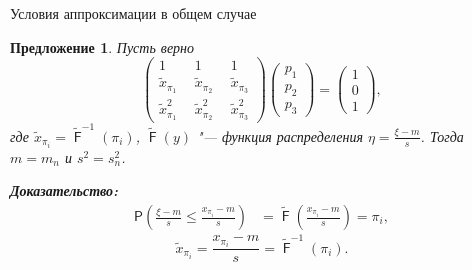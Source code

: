 \documentclass[ucs, notheorems, handout]{beamer}
\newtheorem{proposition}[theorem]{Предложение}
\DeclareMathOperator{\F}{\mathsf{F}}
\begin{document}
\begin{frame}{Условия аппроксимации в общем случае}
	\begin{proposition}\label{pr1}
		Пусть верно 
		\begin{equation*}
			\begin{pmatrix} 
				1&1&1\\ 
				\tilde{x}_{\pi_{1}}~~ &  \tilde{x}_{\pi_{2}}~~  & \tilde{x}_{\pi_{3}} \\ 
				\tilde{x}_{\pi_{1}}^{2}~~&\tilde{x}_{\pi_{2}}^{2}~~  &\tilde{x}_{\pi_{3}}^{2}
			\end{pmatrix}
			\begin{pmatrix}p_{1}\\p_{2}\\ p_{3}\end{pmatrix}= \begin{pmatrix}1\\0\\1 \end{pmatrix},\label{4}
		\end{equation*}
		где $\tilde{x}_{\pi_{i}} = \tilde{\F}^{-1}(\pi_{i})$, $\tilde{\F}(y)$ "--- функция распределения $\displaystyle{\eta = \frac{\xi-m}{s}}$. Тогда $m=m_{n}$ и $s^{2} = s_{n}^{2}$.
	\end{proposition}
\textbf{\textit{Доказательство:}}
\begin{align*}
	\mathsf{P}\left(\frac{\xi-m}{s}\leq \frac{x_{\pi_{i}}-m}{s}\right) &=  \tilde{\F}\left(\frac{x_{\pi_{i}}-m}{s}\right)=\pi_{i},
\end{align*}
\begin{equation*}
	\tilde{x}_{\pi_{i}} = \dfrac{x_{\pi_{i}}-m}{s}=\tilde{\F}^{-1}(\pi_{i}). \label{5}
\end{equation*}
\end{frame}
\end{document}
